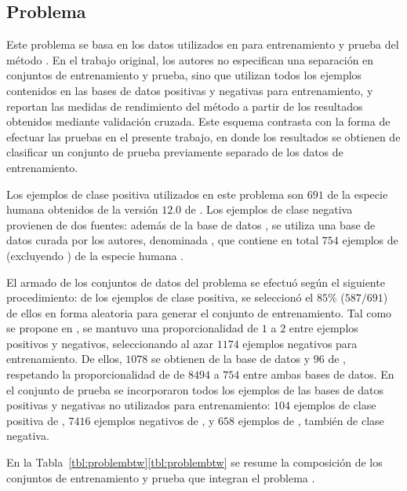 %
%
\subsection{Problema \micropred{}}
%
Este problema se basa en los datos utilizados en \cite{batuwita} para
entrenamiento y prueba del método \work{\micropred}.
En el trabajo original, los autores no especifican una separación
en conjuntos de entrenamiento y prueba, sino que utilizan todos los
ejemplos contenidos en las bases de datos positivas y negativas para
entrenamiento, y reportan las medidas de rendimiento del método
a partir de los resultados obtenidos mediante validación cruzada.
Este esquema contrasta con la forma de efectuar las pruebas en el
presente trabajo, en donde los resultados se obtienen de clasificar un
conjunto de prueba previamente separado de los datos de entrenamiento.

Los ejemplos de clase positiva utilizados en este problema son $691$
 de la especie humana obtenidos de la versión $12$.$0$ de
\dset{\mirbase}.
Los ejemplos de clase negativa provienen de dos fuentes: además de la
base de datos , se utiliza una base de datos curada por
los autores, denominada , que contiene en
total $754$ ejemplos de  (excluyendo ) de la
especie humana \cite{batuwita}.

El armado de los conjuntos de datos del problema \prob\micropred{} se
efectuó según el siguiente procedimiento:
de los ejemplos de clase positiva, se seleccionó el $85\%$ ($587/691$)
de ellos en forma aleatoria para generar el conjunto de entrenamiento.
Tal como se propone en \cite{ng}, se mantuvo una proporcionalidad de
$1$ a $2$ entre ejemplos positivos y negativos, seleccionando al azar
$1174$ ejemplos negativos para entrenamiento.
De ellos, $1078$ se obtienen de la base de datos  y $96$
de , respetando la proporcionalidad de
de $8494$ a $754$ entre ambas bases de datos.
En el conjunto de prueba se incorporaron todos los ejemplos de las
bases de datos positivas y negativas no utilizados para entrenamiento:
$104$ ejemplos de clase positiva de , $7416$ ejemplos
negativos de , y $658$ ejemplos de , también de clase negativa.

En la \iflatexml{}Tabla~\ref{tbl:problembtw}\else\autoref{tbl:problembtw}\fi{}
se resume la composición de los conjuntos de entrenamiento y prueba
que integran el problema \prob\micropred{}.
